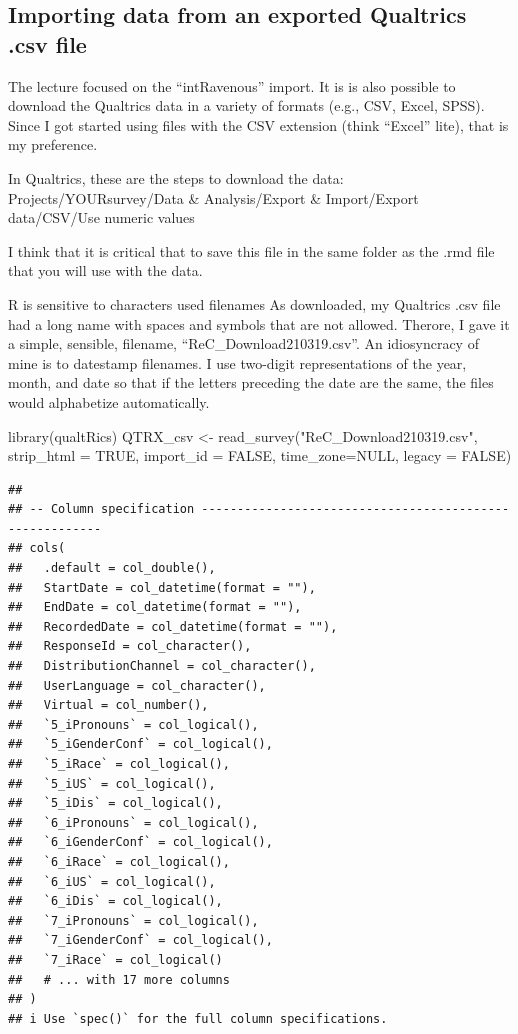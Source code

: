 \documentclass[
]{book}
\newenvironment{Shaded}{\begin{snugshade}}{\end{snugshade}}
\newcommand{\AttributeTok}[1]{\textcolor[rgb]{0.77,0.63,0.00}{#1}}
\newcommand{\ConstantTok}[1]{\textcolor[rgb]{0.00,0.00,0.00}{#1}}
\newcommand{\FunctionTok}[1]{\textcolor[rgb]{0.00,0.00,0.00}{#1}}
\newcommand{\NormalTok}[1]{#1}
\newcommand{\OtherTok}[1]{\textcolor[rgb]{0.56,0.35,0.01}{#1}}
\newcommand{\StringTok}[1]{\textcolor[rgb]{0.31,0.60,0.02}{#1}}
\begin{document}
\hypertarget{importing-data-from-an-exported-qualtrics-.csv-file}{%
\subsection{Importing data from an exported Qualtrics .csv file}\label{importing-data-from-an-exported-qualtrics-.csv-file}}

The lecture focused on the ``intRavenous'' import. It is is also possible to download the Qualtrics data in a variety of formats (e.g., CSV, Excel, SPSS). Since I got started using files with the CSV extension (think ``Excel'' lite), that is my preference.

In Qualtrics, these are the steps to download the data: Projects/YOURsurvey/Data \& Analysis/Export \& Import/Export data/CSV/Use numeric values

I think that it is critical that to save this file in the same folder as the .rmd file that you will use with the data.

R is sensitive to characters used filenames As downloaded, my Qualtrics .csv file had a long name with spaces and symbols that are not allowed. Therore, I gave it a simple, sensible, filename, ``ReC\_Download210319.csv''. An idiosyncracy of mine is to datestamp filenames. I use two-digit representations of the year, month, and date so that if the letters preceding the date are the same, the files would alphabetize automatically.

\begin{Shaded}
\begin{Highlighting}[]
\FunctionTok{library}\NormalTok{(qualtRics)}
\NormalTok{QTRX\_csv }\OtherTok{\textless{}{-}} \FunctionTok{read\_survey}\NormalTok{(}\StringTok{"ReC\_Download210319.csv"}\NormalTok{, }\AttributeTok{strip\_html =} \ConstantTok{TRUE}\NormalTok{, }\AttributeTok{import\_id =} \ConstantTok{FALSE}\NormalTok{, }\AttributeTok{time\_zone=}\ConstantTok{NULL}\NormalTok{, }\AttributeTok{legacy =} \ConstantTok{FALSE}\NormalTok{)}
\end{Highlighting}
\end{Shaded}

\begin{verbatim}
## 
## -- Column specification --------------------------------------------------------
## cols(
##   .default = col_double(),
##   StartDate = col_datetime(format = ""),
##   EndDate = col_datetime(format = ""),
##   RecordedDate = col_datetime(format = ""),
##   ResponseId = col_character(),
##   DistributionChannel = col_character(),
##   UserLanguage = col_character(),
##   Virtual = col_number(),
##   `5_iPronouns` = col_logical(),
##   `5_iGenderConf` = col_logical(),
##   `5_iRace` = col_logical(),
##   `5_iUS` = col_logical(),
##   `5_iDis` = col_logical(),
##   `6_iPronouns` = col_logical(),
##   `6_iGenderConf` = col_logical(),
##   `6_iRace` = col_logical(),
##   `6_iUS` = col_logical(),
##   `6_iDis` = col_logical(),
##   `7_iPronouns` = col_logical(),
##   `7_iGenderConf` = col_logical(),
##   `7_iRace` = col_logical()
##   # ... with 17 more columns
## )
## i Use `spec()` for the full column specifications.
\end{verbatim}
\end{document}
